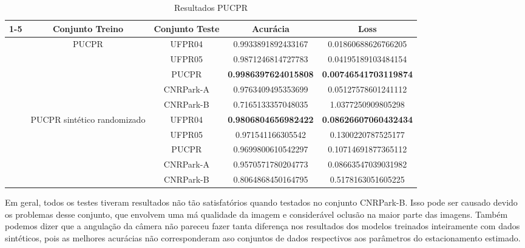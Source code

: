 \begin{table}[!htp] 
\centering
\caption{Resultados PUCPR}
\label{tab:PUCPR}
\begin{tabular}{|c|cccc|}
\cline{1-5}
\multicolumn{1}{|}{} & Conjunto Treino & Conjunto Teste & Acurácia & Loss \\
\hline
\texttt{} & PUCPR & UFPR04 & 0.9933891892433167 & 0.01860688626766205\\
\texttt{} &  & UFPR05 & 0.9871246814727783 & 0.04195189103484154 \\
\texttt{} &  & PUCPR & \textbf{0.9986397624015808} & \textbf{0.00746541703119874} \\
\texttt{} &  & CNRPark-A & 0.9763409495353699 & 0.05127578601241112 \\
\texttt{} &  & CNRPark-B & 0.7165133357048035 & 1.0377250909805298 \\
\hline
\texttt{} & PUCPR sintético randomizado & UFPR04 & \textbf{0.9806804656982422} & \textbf{0.08626607060432434} \\
\texttt{} &  & UFPR05 & 0.971541166305542 & 0.1300220787525177 \\
\texttt{} &  & PUCPR & 0.9699800610542297 & 0.10714691877365112 \\
\texttt{} &  & CNRPark-A & 0.9570571780204773 & 0.08663547039031982 \\
\texttt{} &  & CNRPark-B & 0.8064868450164795 & 0.5178163051605225 \\
\hline
\end{tabular}
\end{table}

Em geral, todos os testes tiveram resultados não tão satisfatórios quando testados no conjunto CNRPark-B. Isso pode ser causado devido os problemas desse conjunto, que envolvem uma má qualidade da imagem e considerável oclusão na maior parte das imagens. Também podemos dizer que a angulação da câmera não pareceu fazer tanta diferença nos resultados dos modelos treinados inteiramente com dados sintéticos, pois as melhores acurácias não corresponderam aso conjuntos de dados respectivos aos parâmetros do estacionamento estimado.

